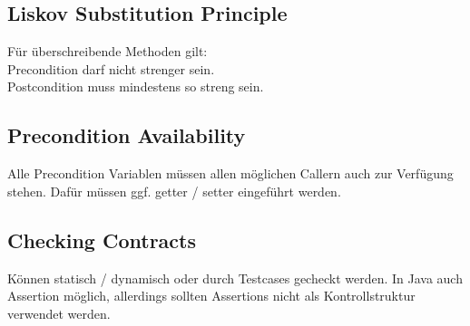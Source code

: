 \subsection{Liskov Substitution Principle}
Für überschreibende Methoden gilt:\\
Precondition darf nicht strenger sein.\\
Postcondition muss mindestens so streng sein.\\

\subsection{Precondition Availability}
Alle Precondition Variablen müssen allen möglichen Callern auch zur Verfügung stehen. Dafür müssen ggf. getter / setter
eingeführt werden.

\subsection{Checking Contracts}
Können statisch / dynamisch oder durch Testcases gecheckt werden.
In Java auch Assertion möglich, allerdings sollten Assertions nicht als Kontrollstruktur verwendet werden.
  
    